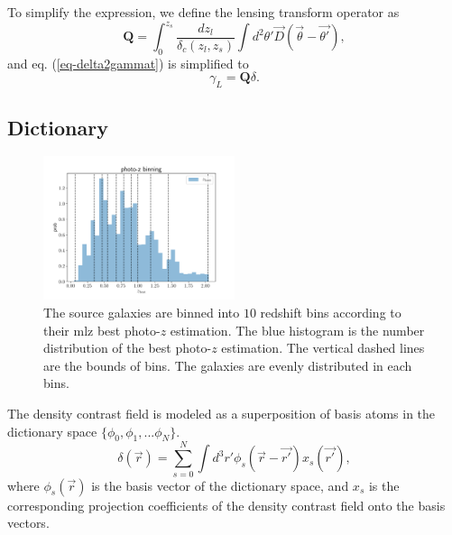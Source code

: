 \documentclass[twocolumn]{aastex62}
\begin{document}
To simplify the expression, we define the lensing transform operator as
\begin{equation}
\mathbf{Q}=\int_0^{z_s} \frac{dz_l}{\delta_{c}(z_l,z_s)} \int d^2 \theta'  \vec{D}(\vec{\theta}-\vec{\theta'}),
\end{equation}
and eq. (\ref{eq-delta2gammat}) is simplified to
\begin{equation} \label{eq-delta2gammat-simp}
\gamma_L=\mathbf{Q}\delta.
\end{equation}

\subsection{Dictionary}
\label{subsec:method-dictionary}
\begin{figure}
 \centering
 \includegraphics[width=0.5\textwidth]{photo-z_binning.pdf}
 \caption{The source galaxies are binned into $10$ redshift bins according to their mlz best photo-$z$ estimation.
        The blue histogram is the number distribution of the best photo-$z$ estimation. The vertical dashed lines
        are the bounds of bins. The galaxies are evenly distributed in each bins.}
\end{figure}

The density contrast field is modeled as a superposition of basis atoms in the dictionary space $\{\phi_0,\phi_1,...\phi_{N}\}$.
\begin{equation}\label{eq-x2delta}
\delta(\vec{r}) = \sum_{s=0}^{N} \int d^3 r' \phi_s(\vec{r}-\vec{r'}) x_s(\vec{r'}),
\end{equation}
where $\phi_s(\vec{r})$ is the basis vector of the dictionary space, and $x_s$ is the corresponding projection
coefficients of the density contrast field onto the basis vectors.
\end{document}
